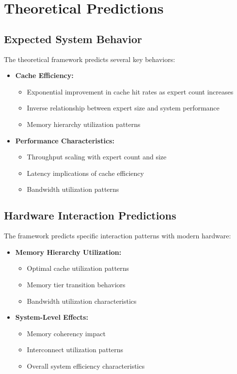 \documentclass[11pt]{article}
\begin{document}
\section{Theoretical Predictions}

\subsection{Expected System Behavior}

The theoretical framework predicts several key behaviors:

\begin{itemize}
    \item \textbf{Cache Efficiency:}
    \begin{itemize}
        \item Exponential improvement in cache hit rates as expert count increases
        \item Inverse relationship between expert size and system performance
        \item Memory hierarchy utilization patterns
    \end{itemize}

    \item \textbf{Performance Characteristics:}
    \begin{itemize}
        \item Throughput scaling with expert count and size
        \item Latency implications of cache efficiency
        \item Bandwidth utilization patterns
    \end{itemize}
\end{itemize}

\subsection{Hardware Interaction Predictions}

The framework predicts specific interaction patterns with modern hardware:

\begin{itemize}
    \item \textbf{Memory Hierarchy Utilization:}
    \begin{itemize}
        \item Optimal cache utilization patterns
        \item Memory tier transition behaviors
        \item Bandwidth utilization characteristics
    \end{itemize}
    \item \textbf{System-Level Effects:}
    \begin{itemize}
        \item Memory coherency impact
        \item Interconnect utilization patterns
        \item Overall system efficiency characteristics
    \end{itemize}
\end{itemize}
\end{document}
